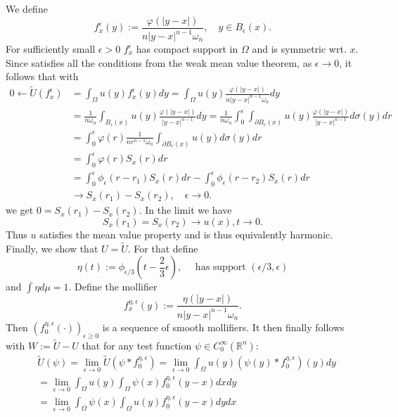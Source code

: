\documentclass[A4,12pt,twoside]{book}
\begin{document}
{\[ \]
 We define
 \[
 f_x^\epsilon (y) := \frac{\varphi (|y-x|)}{n|y-x|^{n-1} \omega_n}, \quad y \in B_\epsilon (x).
 \]
For sufficiently small $\epsilon >0$ $f_x^\epsilon$ has compact support in $\Omega$ and is symmetric wrt. $x$. Since satisfies all the conditions from the weak mean value theorem, as $\epsilon \to 0$, it follows that with
\begin{align*}
   0\leftarrow \tilde{U} (f_x^\epsilon) &= \int_\Omega u(y) f_x^\epsilon (y) dy = \int_\Omega u(y)\frac{\varphi (|y-x|)}{n|y-x|^{n-1} \omega_n} dy \\
    &= \frac{1}{n\omega_n} \int_{B_\epsilon (x) } u(y) \frac{\varphi (|y-x|)}{|y-x|^{n-1} } dy = \frac{1}{n\omega_n} \int_0^\epsilon \int_{\partial B_r (x) } u(y) \frac{\varphi (|y-x|)}{|y-x|^{n-1} } d\sigma ( y)  dr\\
    &= \int_0^\epsilon \varphi (r) \frac{1}{nr^{n-1}\omega_n} \int_{\partial B_r (x) } u(y)  d\sigma ( y)  dr \\
    &= \int_0^\epsilon \varphi (r) S_x (r)  dr \\
    &= \int_0^\epsilon \phi_\epsilon (r-r_1) S_x (r)  dr  - \int_0^\epsilon \phi_\epsilon (r-r_2) S_x (r)  dr  \\
    & \to  S_x (r_1) -  S_x (r_2), \quad \epsilon \to 0.
\end{align*}
we get $0=S_x (r_1 ) - S_x (r_2)$. In the limit we have
\[
S_x (r_1) = S_x (r_2)  \to u(x), t \to 0.
\]
Thus $u$ satisfies the mean value property and is thus equivalently harmonic.\\
Finally, we show that $U = \tilde{U}$. For that define
\[
\eta (t) := \phi_{\epsilon/3} (t- \frac{2}{3} \epsilon), \quad \text{ has support }(\epsilon/3,\epsilon)
\]
and $\int \eta d \mu =1$. Define the mollifier
\[
f_x^{\eta,\epsilon} (y) := \frac{\eta (|y-x|)}{n |y-x|^{n-1} \omega_n}.
\]
Then $(f_0^{\eta,\epsilon} (\cdot ))_{\epsilon \geq 0}$ is a sequence of smooth mollifiers. It then finally follows with $W := \tilde{U} - U$ that for any test function $\psi \in C_0^\infty (\mathbb{R}^n)$: 
\begin{align*}
    &\tilde{U}(\psi) = \lim_{\epsilon \to 0} \tilde{U} (\psi * f_0^{\eta, \epsilon}) = \lim_{\epsilon \to 0} \int_\Omega u(y) (\psi (y) * f_0^{\eta, \epsilon} )(y) dy \\
    &= \lim_{\epsilon \to 0} \int_\Omega u(y) \int_\Omega \psi (x)  f_0^{\eta, \epsilon} (y-x) dx dy \\
    &= \lim_{\epsilon \to 0} \int_\Omega \psi (x) \int_\Omega  u(y) f_0^{\eta, \epsilon} (y-x)  dy dx \\

\end{align*}}
\end{document}
